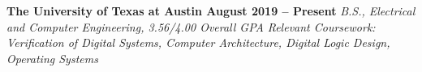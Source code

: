 \documentclass[../main.tex]{subfiles}
\begin{document}
%
\hspace*{4mm}\textbf{{\fontsize{\textFontSize}{\textFontBox}\selectfont The University of Texas at Austin \hfill August 2019 – Present}}
\vspace{-1mm}\newline
%
%
\hspace*{4mm}\textit{{\fontsize{\textFontSize}{\textFontBox}\selectfont B.S., Electrical and Computer Engineering, 3.56/4.00 Overall GPA }}\vspace{-1mm}\newline
\hspace*{4mm}\textit{{\fontsize{\textFontSize}{\textFontBox}\selectfont Relevant Coursework: Verification of Digital Systems, Computer Architecture, Digital Logic Design, Operating Systems }}\vspace{-3mm}\newline
%
%
\end{document}
